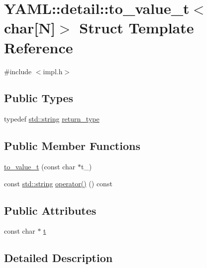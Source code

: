\hypertarget{struct_y_a_m_l_1_1detail_1_1to__value__t_3_01char[_n]_4}{}\section{Y\+A\+ML\+::detail\+::to\+\_\+value\+\_\+t$<$ char\mbox{[}N\mbox{]}$>$ Struct Template Reference}
\label{struct_y_a_m_l_1_1detail_1_1to__value__t_3_01char[_n]_4}


{\ttfamily \#include $<$impl.\+h$>$}

\subsection*{Public Types}
\begin{DoxyCompactItemize}
\item 
typedef \mbox{\hyperlink{glad_8h_ac83513893df92266f79a515488701770}{std\+::string}} \mbox{\hyperlink{struct_y_a_m_l_1_1detail_1_1to__value__t_3_01char[_n]_4_a2a232ec362cd04a84ac5019268259923}{return\+\_\+type}}
\end{DoxyCompactItemize}
\subsection*{Public Member Functions}
\begin{DoxyCompactItemize}
\item 
\mbox{\hyperlink{struct_y_a_m_l_1_1detail_1_1to__value__t_3_01char[_n]_4_a298c5e86c0eea6db34f432664008f5d6}{to\+\_\+value\+\_\+t}} (const char $\ast$t\+\_\+)
\item 
const \mbox{\hyperlink{glad_8h_ac83513893df92266f79a515488701770}{std\+::string}} \mbox{\hyperlink{struct_y_a_m_l_1_1detail_1_1to__value__t_3_01char[_n]_4_a6c442381a4485e3af6de08beb68dc472}{operator()}} () const
\end{DoxyCompactItemize}
\subsection*{Public Attributes}
\begin{DoxyCompactItemize}
\item 
const char $\ast$ \mbox{\hyperlink{struct_y_a_m_l_1_1detail_1_1to__value__t_3_01char[_n]_4_a35ed5e6cd3f46a1a9986897941130732}{t}}
\end{DoxyCompactItemize}


\subsection{Detailed Description}
